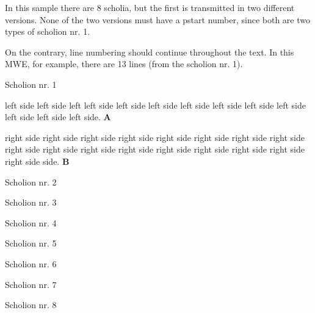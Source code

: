 \documentclass[a4paper]{book}
\begin{document}
In this sample there are 8 scholia, but the first is transmitted in two different versions. None of the two versions must have a pstart number, since both are two types of scholion nr. 1.

On the contrary, line numbering should continue throughout the text. In this MWE, for example, there are 13 lines (from the scholion nr. 1).

\bigskip

\beginnumbering
\numberpstarttrue
{}

\pstart{}%
    Scholion nr. 1%
\pend
\pausenumbering*

\begin{pairs}\sloppy
\begin{Leftside}
\resumenumbering*
    \pstart\noindent left side left side left  left side left side left side left side left side left side left side left side left side left side. \textbf{A}\pend
\pausenumbering*
\end{Leftside}
\begin{Rightside}
\resumenumbering*
    \pstart\noindent {} right side right side right side right side right side right side right side right side right side right side right side right side right side right side right side right side right side  side. \textbf{B}\pend
\pausenumbering*
\end{Rightside}
\end{pairs}
\Columns

\resumenumbering*

\pstart%
    Scholion nr. 2%
\pend

\pstart%
    Scholion nr. 3%
\pend

\pstart%
    Scholion nr. 4%
\pend

\pstart%
    Scholion nr. 5%
\pend

\pstart%
    Scholion nr. 6%
\pend

\pstart%
    Scholion nr. 7%
\pend

\pstart%
    Scholion nr. 8%
\pend

\endnumbering
\end{document}
